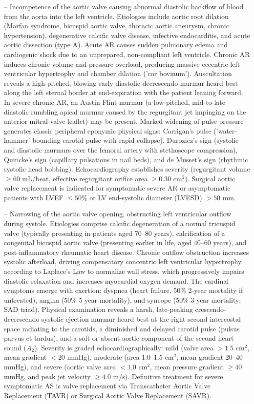 -- Incompetence of the aortic valve causing abnormal diastolic backflow of blood from the aorta into the left ventricle. Etiologies include aortic root dilation (Marfan syndrome, bicuspid aortic valve, thoracic aortic aneurysm, chronic hypertension), degenerative calcific valve disease, infective endocarditis, and acute aortic dissection (type A). Acute AR causes sudden pulmonary edema and cardiogenic shock due to an unprepared, non-compliant left ventricle. Chronic AR induces chronic volume and pressure overload, producing massive eccentric left ventricular hypertrophy and chamber dilation ('cor bovinum'). Auscultation reveals a high-pitched, blowing early diastolic decrescendo murmur heard best along the left sternal border at end-expiration with the patient leaning forward. In severe chronic AR, an Austin Flint murmur (a low-pitched, mid-to-late diastolic rumbling apical murmur caused by the regurgitant jet impinging on the anterior mitral valve leaflet) may be present. Marked widening of pulse pressure generates classic peripheral eponymic physical signs: Corrigan's pulse ('water-hammer' bounding carotid pulse with rapid collapse), Duroziez's sign (systolic and diastolic murmurs over the femoral artery with stethoscope compression), Quincke's sign (capillary pulsations in nail beds), and de Musset's sign (rhythmic systolic head bobbing). Echocardiography establishes severity (regurgitant volume $\ge 60$ mL/beat, effective regurgitant orifice area $\ge 0.30$ cm$^2$). Surgical aortic valve replacement is indicated for symptomatic severe AR or asymptomatic patients with LVEF $\le 50\%$ or LV end-systolic diameter (LVESD) $>50$ mm.

-- Narrowing of the aortic valve opening, obstructing left ventricular outflow during systole. Etiologies comprise calcific degeneration of a normal tricuspid valve (typically presenting in patients aged 70--80 years), calcification of a congenital bicuspid aortic valve (presenting earlier in life, aged 40--60 years), and post-inflammatory rheumatic heart disease. Chronic outflow obstruction increases systolic afterload, driving compensatory concentric left ventricular hypertrophy according to Laplace's Law to normalize wall stress, which progressively impairs diastolic relaxation and increases myocardial oxygen demand. The cardinal symptoms emerge with exertion: dyspnea (heart failure, 50\% 2-year mortality if untreated), angina (50\% 5-year mortality), and syncope (50\% 3-year mortality; SAD triad). Physical examination reveals a harsh, late-peaking crescendo-decrescendo systolic ejection murmur heard best at the right second intercostal space radiating to the carotids, a diminished and delayed carotid pulse (pulsus parvus et tardus), and a soft or absent aortic component of the second heart sound ($A_2$). Severity is graded echocardiographically: mild (valve area $>1.5$ cm$^2$, mean gradient $<20$ mmHg), moderate (area 1.0--1.5 cm$^2$, mean gradient 20--40 mmHg), and severe (aortic valve area $<1.0$ cm$^2$, mean pressure gradient $\ge 40$ mmHg, and peak jet velocity $\ge 4.0$ m/s). Definitive treatment for severe symptomatic AS is valve replacement via Transcatheter Aortic Valve Replacement (TAVR) or Surgical Aortic Valve Replacement (SAVR).

